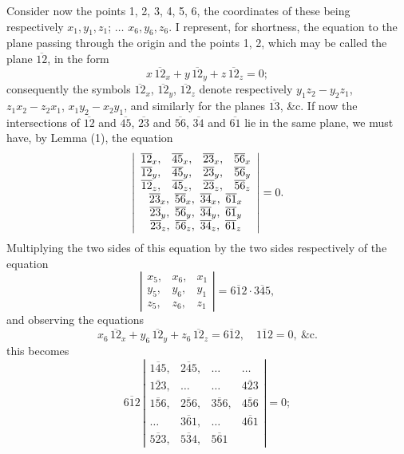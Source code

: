 \documentclass[11pt]{article}
\begin{document}
Consider now the points 1, 2, 3, 4, 5, 6, the coordinates of these being respectively $x_1, y_1, z_1$; $\ldots$ $x_6, y_6, z_6$. I represent, for shortness, the equation to the plane passing through the origin and the points 1, 2, which may be called the plane $\overline{12}$, in the form
\[
x\,\overline{12}_x + y\,\overline{12}_y + z\,\overline{12}_z = 0;
\]
consequently the symbols $\overline{12}_x$, $\overline{12}_y$, $\overline{12}_z$ denote respectively $y_1 z_2 - y_2 z_1$, $z_1 x_2 - z_2 x_1$, $x_1 y_2 - x_2 y_1$, and similarly for the planes $\overline{13}$, \&c. If now the intersections of $\overline{12}$ and $\overline{45}$, $\overline{23}$ and $\overline{56}$, $\overline{34}$ and $\overline{61}$ lie in the same plane, we must have, by Lemma (1), the equation
\[
\left|\begin{array}{cccc}
\overline{12}_x, & \overline{45}_x, & \overline{23}_x, & \overline{56}_x \\
\overline{12}_y, & \overline{45}_y, & \overline{23}_y, & \overline{56}_y \\
\overline{12}_z, & \overline{45}_z, & \overline{23}_z, & \overline{56}_z \\
\multicolumn{4}{c}{\overline{23}_x,\ \overline{56}_x,\ \overline{34}_x,\ \overline{61}_x} \\
\multicolumn{4}{c}{\overline{23}_y,\ \overline{56}_y,\ \overline{34}_y,\ \overline{61}_y} \\
\multicolumn{4}{c}{\overline{23}_z,\ \overline{56}_z,\ \overline{34}_z,\ \overline{61}_z}
\end{array}\right| = 0.
\]
Multiplying the two sides of this equation by the two sides respectively of the equation
\[
\left|\begin{array}{ccc}
x_5, & x_6, & x_1 \\
y_5, & y_6, & y_1 \\
z_5, & z_6, & z_1
\end{array}\right| = \overline{612}\cdot\overline{345},
\]
and observing the equations
\[
x_6\,\overline{12}_x + y_6\,\overline{12}_y + z_6\,\overline{12}_z = \overline{612},\quad \overline{112} = 0,\ \&\text{c.}
\]
this becomes
\[
\overline{612}\,\left|\begin{array}{cccc}
\overline{145}, & \overline{245}, & \ldots & \ldots \\
\overline{123}, & \ldots & \ldots & \overline{423} \\
\overline{156}, & \overline{256}, & \overline{356}, & \overline{456} \\
\ldots & \overline{361}, & \ldots & \overline{461} \\
\overline{523}, & \overline{534}, & \overline{561} &
\end{array}\right| = 0;
\]
\end{document}
